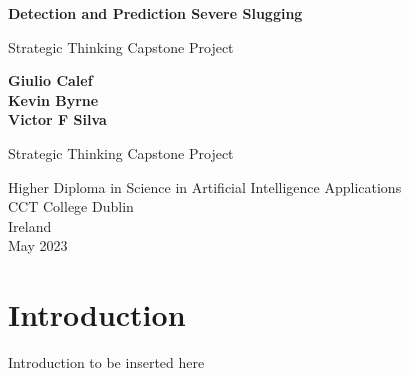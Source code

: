 \documentclass{article}
\begin{document}
\begin{titlepage}
   \begin{center}
       \vspace*{1cm}

       \textbf{Detection and Prediction Severe Slugging}

       \vspace{0.5cm}
        Strategic Thinking Capstone Project
            
       \vspace{1.5cm}

       \textbf{Giulio Calef} \\
       \textbf{Kevin Byrne} \\
       \textbf{Victor F Silva} \\

       \vfill
            
       Strategic Thinking Capstone Project
            
       \vspace{0.8cm}
     
            
       Higher Diploma in Science in Artificial Intelligence Applications\\
       CCT College Dublin\\
       Ireland\\
       May 2023
            
   \end{center}
\end{titlepage}





\section{Introduction}

Introduction to be inserted here
\end{document}
